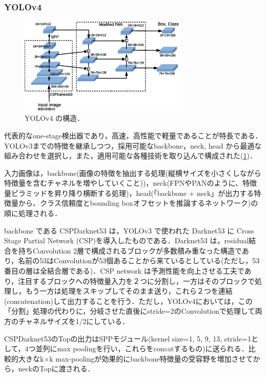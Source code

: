 \documentclass[originalpaper,fleqn]{jsaiart}     %
\begin{document}
\subsubsection{YOLOv4}
\begin{figure}[tb]
    \begin{center}
        \includegraphics[width=8cm,clip]{fig/archi_YOLOv4.eps}
    \end{center}
    \caption{ YOLOv4 の構造．}
    \label{fig:archi_YOLOv4}
\end{figure}
代表的なone-stage検出器であり，高速，高性能で軽量であることが特長である\cite{BWL20}．YOLOv3までの特徴を継承しつつ，採用可能なbackbone，neck, head から最適な組み合わせを選択し，また，適用可能な各種技術を取り込んで構成された(\ref{fig:archi_YOLOv4})．

入力画像は，backbone(画像の特徴を抽出する処理(縦横サイズを小さくしながら特徴量を含むチャネルを増やしていくこと))，neck(FPNやPANのように、特徴量ピラミッドを昇り降り横断する処理)，head(「backbone + neck」が出力する特徴量から、クラス信頼度とbounding boxオフセットを推論するネットワーク)の順に処理される．

backbone である CSPDarknet53 は，YOLOv3 で使われた Darknet53 に Cross Stage Partial Network (CSP)を導入したものである．Darknet53 は，residual結合を持ちConvolution 2層で構成されるブロックが多数積み重なった構造であり，名前の53はConvolutionが53個あることから来ているとしている(ただし，53番目の層は全結合層である)．CSP network は予測性能を向上させる工夫であり，注目するブロックへの特徴量入力を２つに分割し，一方はそのブロックで処理し，もう一方は処理をスキップしてそのまま送り，これら２つを連結(concatenation)して出力することを行う．ただし，YOLOv4においては，この「分割」処理の代わりに，分岐させた直後にstride=2のConvolutionで処理して両方のチャネルサイズを1/2にしている．

CSPDarknet53のTopの出力はSPPモジュール(kernel size={1, 5, 9, 13}, stride=1として，4つ並列にmax poolingを行い，これらをconcatするもの)に送られる．比較的大きなk$\times$k max-poolingが効果的にbackbone特徴量の受容野を増加させてから，neckのTopに渡される．
\end{document}
